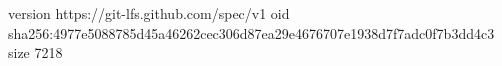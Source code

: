 version https://git-lfs.github.com/spec/v1
oid sha256:4977e5088785d45a46262cec306d87ea29e4676707e1938d7f7adc0f7b3dd4c3
size 7218
